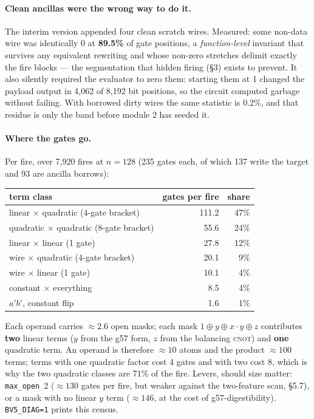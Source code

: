 \documentclass[11pt]{article}
\newcommand{\g}{\textsf{g57}}
\newcommand{\doc}[1]{\texttt{#1}}
\newcommand{\xor}{\oplus}
\begin{document}
\paragraph{Clean ancillas were the wrong way to do it.} The interim version appended four clean
scratch wires. Measured: some non-data wire was identically 0 at \textbf{89.5\%} of gate
positions, a \emph{function-level} invariant that survives any equivalent rewriting and whose
non-zero stretches delimit exactly the fire blocks --- the segmentation that hidden firing
(\S3) exists to prevent. It also silently required the evaluator to zero them: starting them at
1 changed the payload output in 4,062 of 8,192 bit positions, so the circuit computed garbage
without failing. With borrowed dirty wires the same statistic is 0.2\%, and that residue is only
the band before module 2 has seeded it.

\paragraph{Where the gates go.} Per fire, over 7,920 fires at $n=128$ (235 gates each, of which
137 write the target and 93 are ancilla borrows):

\begin{center}\small
\begin{tabular}{@{}lrr@{}}\toprule
term class & gates per fire & share\\\midrule
linear $\times$ quadratic (4-gate bracket) & 111.2 & 47\%\\
quadratic $\times$ quadratic (8-gate bracket) & 55.6 & 24\%\\
linear $\times$ linear (1 gate) & 27.8 & 12\%\\
wire $\times$ quadratic (4-gate bracket) & 20.1 & 9\%\\
wire $\times$ linear (1 gate) & 10.1 & 4\%\\
constant $\times$ everything & 8.5 & 4\%\\
$a'b'$, constant flip & 1.6 & 1\%\\
\bottomrule\end{tabular}
\end{center}

Each operand carries ${\approx}2.6$ open masks; each mask $1 \xor y \xor x{\cdot}y \xor z$
contributes \textbf{two} linear terms ($y$ from the \g{} form, $z$ from the balancing
\textsc{cnot}) and \textbf{one} quadratic term. An operand is therefore ${\approx}10$ atoms and
the product ${\approx}100$ terms; terms with one quadratic factor cost 4 gates and with two cost
8, which is why the two quadratic classes are 71\% of the fire. Levers, should size matter:
\doc{max\_open}~2 (${\approx}130$ gates per fire, but weaker against the two-feature scan,
\S5.7), or a mask with no linear $y$ term (${\approx}146$, at the cost of \g{}-digestibility).
\doc{BV5\_DIAG=1} prints this census.
\end{document}
